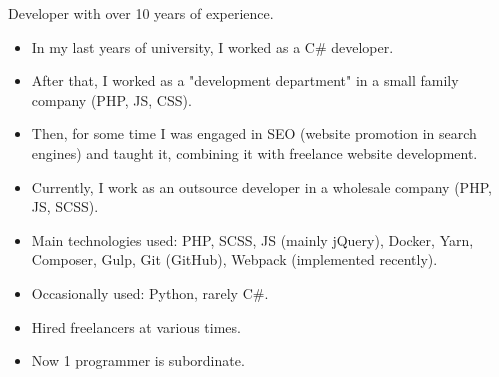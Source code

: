 \begin{minipage}[t]{0.55\textwidth} %
	\vspace{-\baselineskip} %


	Developer with over 10 years of experience.
  \bigskip
  \small{
    \begin{itemize}[leftmargin=1pt]
      \item In my last years of university, I worked as a C\# developer.
      \item After that, I worked as a "development department" in a small family company (PHP, JS, CSS).
      \item Then, for some time I was engaged in SEO (website promotion in search engines) and taught it, combining it with freelance website development.
      \item Currently, I work as an outsource developer in a wholesale company (PHP, JS, SCSS).
      \item{Main technologies used: PHP, SCSS, JS (mainly jQuery), Docker, Yarn, Composer, Gulp, Git (GitHub), Webpack (implemented recently).}
      \item Occasionally used: Python, rarely C\#.
      \item Hired freelancers at various times.
      \item Now 1 programmer is subordinate.
    \end{itemize}
  }
\end{minipage}
\hfill %
\begin{minipage}[t]{0.35\textwidth} %
	 \vspace{-\baselineskip} %

   
\end{minipage}






